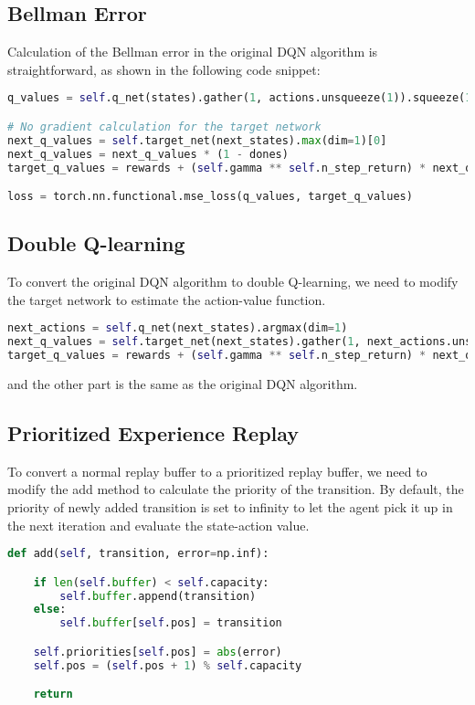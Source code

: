 \subsection{Bellman Error}
Calculation of the Bellman error in the original DQN algorithm is straightforward, as shown in the following code snippet:

\begin{lstlisting}[language=Python]
q_values = self.q_net(states).gather(1, actions.unsqueeze(1)).squeeze(1)

# No gradient calculation for the target network
next_q_values = self.target_net(next_states).max(dim=1)[0]
next_q_values = next_q_values * (1 - dones)
target_q_values = rewards + (self.gamma ** self.n_step_return) * next_q_values

loss = torch.nn.functional.mse_loss(q_values, target_q_values)
\end{lstlisting}


\subsection{Double Q-learning}
To convert the original DQN algorithm to double Q-learning, we need to modify the target network to estimate the action-value function.

\begin{lstlisting}[language=Python]
next_actions = self.q_net(next_states).argmax(dim=1)
next_q_values = self.target_net(next_states).gather(1, next_actions.unsqueeze(1)).squeeze(1)
target_q_values = rewards + (self.gamma ** self.n_step_return) * next_q_values
\end{lstlisting}

and the other part is the same as the original DQN algorithm.

\subsection{Prioritized Experience Replay}
To convert a normal replay buffer to a prioritized replay buffer, we need to modify the add method to calculate the priority of the transition. By default, the priority of newly added transition is set to infinity to let the agent pick it up in the next iteration and evaluate the state-action value.

\begin{lstlisting}[language=Python]
def add(self, transition, error=np.inf):

    if len(self.buffer) < self.capacity:
        self.buffer.append(transition)
    else:
        self.buffer[self.pos] = transition

    self.priorities[self.pos] = abs(error)
    self.pos = (self.pos + 1) % self.capacity

    return
\end{lstlisting}


